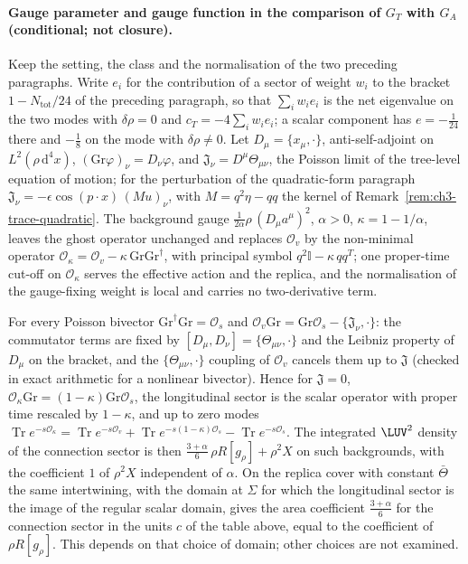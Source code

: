\paragraph{Gauge parameter and gauge function in the comparison of \(G_T\) with \(G_A\) (conditional; not closure).}
Keep the setting, the class and the normalisation of the two preceding paragraphs. Write \(e_i\) for the contribution of a sector of weight \(w_i\) to the bracket \(1-N_{\mathrm{tot}}/24\) of the preceding paragraph, so that \(\sum_iw_ie_i\) is the net eigenvalue on the two modes with \(\delta\rho=0\) and \(c_T=-4\sum_iw_ie_i\); a scalar component has \(e=-\tfrac1{24}\) there and \(-\tfrac18\) on the mode with \(\delta\rho\neq0\). Let \(D_\mu=\{x_\mu,\cdot\}\), anti-self-adjoint on \(L^2(\rho\,\mathrm d^4x)\), \((\mathrm{Gr}\varphi)_\nu=D_\nu\varphi\), and \(\mathfrak J_\nu=D^\mu\Theta_{\mu\nu}\), the Poisson limit of the tree-level equation of motion; for the perturbation of the quadratic-form paragraph \(\mathfrak J_\nu=-\epsilon\cos(p\cdot x)\,(Mu)_\nu\), with \(M=q^2\eta-qq\) the kernel of Remark~\ref{rem:ch3-trace-quadratic}. The background gauge \(\tfrac1{2\alpha}\rho\,(D_\mu a^\mu)^2\), \(\alpha>0\), \(\kappa=1-1/\alpha\), leaves the ghost operator unchanged and replaces \(\mathcal O_v\) by the non-minimal operator \(\mathcal O_\kappa=\mathcal O_v-\kappa\,\mathrm{Gr}\mathrm{Gr}^\dagger\), with principal symbol \(q^2\mathbb I-\kappa\,qq^{T}\); one proper-time cut-off on \(\mathcal O_\kappa\) serves the effective action and the replica, and the normalisation of the gauge-fixing weight is local and carries no two-derivative term.

For every Poisson bivector \(\mathrm{Gr}^\dagger\mathrm{Gr}=\mathcal O_s\) and \(\mathcal O_v\mathrm{Gr}=\mathrm{Gr}\mathcal O_s-\{\mathfrak J_\nu,\cdot\}\): the commutator terms are fixed by \([D_\mu,D_\nu]=\{\Theta_{\mu\nu},\cdot\}\) and the Leibniz property of \(D_\mu\) on the bracket, and the \(\{\Theta_{\mu\nu},\cdot\}\) coupling of \(\mathcal O_v\) cancels them up to \(\mathfrak J\) (checked in exact arithmetic for a nonlinear bivector). Hence for \(\mathfrak J=0\), \(\mathcal O_\kappa\mathrm{Gr}=(1-\kappa)\mathrm{Gr}\mathcal O_s\), the longitudinal sector is the scalar operator with proper time rescaled by \(1-\kappa\), and up to zero modes \(\operatorname{Tr}e^{-s\mathcal O_\kappa}=\operatorname{Tr}e^{-s\mathcal O_v}+\operatorname{Tr}e^{-s(1-\kappa)\mathcal O_s}-\operatorname{Tr}e^{-s\mathcal O_s}\). The integrated \(\LUV^2\) density of the connection sector is then \(\tfrac{3+\alpha}6\,\rho R[g_\rho]+\rho^2X\) on such backgrounds, with the coefficient \(1\) of \(\rho^2X\) independent of \(\alpha\). On the replica cover with constant \(\bar\Theta\) the same intertwining, with the domain at \(\Sigma\) for which the longitudinal sector is the image of the regular scalar domain, gives the area coefficient \(\tfrac{3+\alpha}6\) for the connection sector in the units \(c\) of the table above, equal to the coefficient of \(\rho R[g_\rho]\). This depends on that choice of domain; other choices are not examined.

